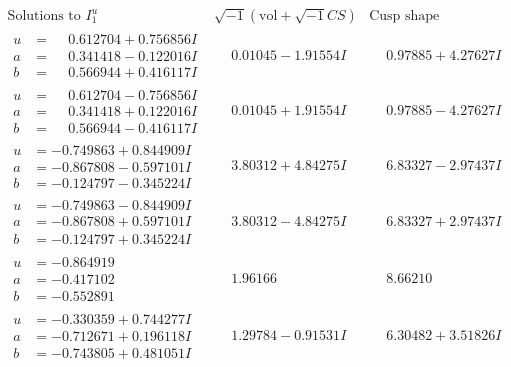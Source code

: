 \documentclass[1p]{elsarticle_modified}
\theoremstyle{definition}
\newcommand{\I}{\sqrt{-1}}
\begin{document}
$$\begin{array}{c|c|c}  
\text{Solutions to }I^u_{1}& \I (\text{vol} + \sqrt{-1}CS) & \text{Cusp shape}\\
 \hline 
\begin{aligned}
u &= \phantom{-}0.612704 + 0.756856 I \\
a &= \phantom{-}0.341418 - 0.122016 I \\
b &= \phantom{-}0.566944 + 0.416117 I\end{aligned}
 & \phantom{-}0.01045 - 1.91554 I & \phantom{-}0.97885 + 4.27627 I \\ \hline\begin{aligned}
u &= \phantom{-}0.612704 - 0.756856 I \\
a &= \phantom{-}0.341418 + 0.122016 I \\
b &= \phantom{-}0.566944 - 0.416117 I\end{aligned}
 & \phantom{-}0.01045 + 1.91554 I & \phantom{-}0.97885 - 4.27627 I \\ \hline\begin{aligned}
u &= -0.749863 + 0.844909 I \\
a &= -0.867808 - 0.597101 I \\
b &= -0.124797 - 0.345224 I\end{aligned}
 & \phantom{-}3.80312 + 4.84275 I & \phantom{-}6.83327 - 2.97437 I \\ \hline\begin{aligned}
u &= -0.749863 - 0.844909 I \\
a &= -0.867808 + 0.597101 I \\
b &= -0.124797 + 0.345224 I\end{aligned}
 & \phantom{-}3.80312 - 4.84275 I & \phantom{-}6.83327 + 2.97437 I \\ \hline\begin{aligned}
u &= -0.864919\phantom{ +0.000000I} \\
a &= -0.417102\phantom{ +0.000000I} \\
b &= -0.552891\phantom{ +0.000000I}\end{aligned}
 & \phantom{-}1.96166\phantom{ +0.000000I} & \phantom{-}8.66210\phantom{ +0.000000I} \\ \hline\begin{aligned}
u &= -0.330359 + 0.744277 I \\
a &= -0.712671 + 0.196118 I \\
b &= -0.743805 + 0.481051 I\end{aligned}
 & \phantom{-}1.29784 - 0.91531 I & \phantom{-}6.30482 + 3.51826 I \\ \hline\begin{aligned}

\end{aligned}
\end{array}$$
\end{document}
